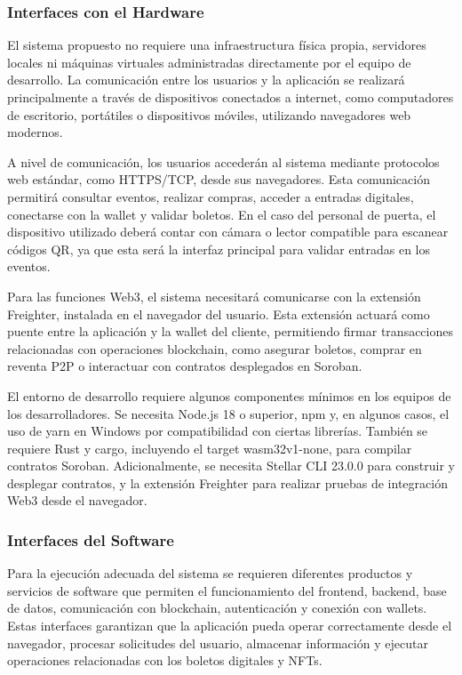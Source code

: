 \documentclass[12pt,letterpaper]{article}
\begin{document}
\subsubsection{Interfaces con el Hardware}
El sistema propuesto no requiere una infraestructura física propia, servidores locales ni máquinas virtuales administradas directamente por el equipo de desarrollo. La comunicación entre los usuarios y la aplicación se realizará principalmente a través de dispositivos conectados a internet, como computadores de escritorio, portátiles o dispositivos móviles, utilizando navegadores web modernos.

A nivel de comunicación, los usuarios accederán al sistema mediante protocolos web estándar, como HTTPS/TCP, desde sus navegadores. Esta comunicación permitirá consultar eventos, realizar compras, acceder a entradas digitales, conectarse con la wallet y validar boletos. En el caso del personal de puerta, el dispositivo utilizado deberá contar con cámara o lector compatible para escanear códigos QR, ya que esta será la interfaz principal para validar entradas en los eventos.

Para las funciones Web3, el sistema necesitará comunicarse con la extensión Freighter, instalada en el navegador del usuario. Esta extensión actuará como puente entre la aplicación y la wallet del cliente, permitiendo firmar transacciones relacionadas con operaciones blockchain, como asegurar boletos, comprar en reventa P2P o interactuar con contratos desplegados en Soroban.

El entorno de desarrollo requiere algunos componentes mínimos en los equipos de los desarrolladores. Se necesita Node.js 18 o superior, npm y, en algunos casos, el uso de yarn en Windows por compatibilidad con ciertas librerías. También se requiere Rust y cargo, incluyendo el target wasm32v1-none, para compilar contratos Soroban. Adicionalmente, se necesita Stellar CLI 23.0.0 para construir y desplegar contratos, y la extensión Freighter para realizar pruebas de integración Web3 desde el navegador.

\subsubsection{Interfaces del Software}
Para la ejecución adecuada del sistema se requieren diferentes productos y servicios de software que permiten el funcionamiento del frontend, backend, base de datos, comunicación con blockchain, autenticación y conexión con wallets. Estas interfaces garantizan que la aplicación pueda operar correctamente desde el navegador, procesar solicitudes del usuario, almacenar información y ejecutar operaciones relacionadas con los boletos digitales y NFTs.
\end{document}
